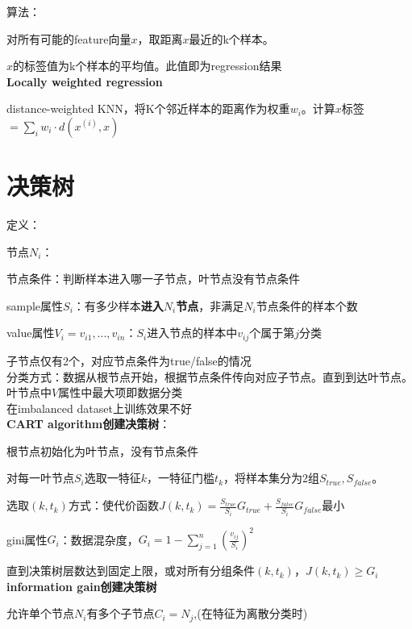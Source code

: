 \documentclass[UTF8]{ctexart}
\begin{document}
  算法：

  \quad 对所有可能的feature向量$x$，取距离$x$最近的k个样本。
  
  \quad $x$的标签值为k个样本的平均值。此值即为regression结果\\
\textbf{Locally weighted regression}

  distance-weighted KNN，将K个邻近样本的距离作为权重$w_i$。计算$x$标签$ = \sum_i w_i \cdot d(x^{(i)}, x)$



\section{决策树}
\noindent 定义：

  节点$N_i$：

  \quad 节点条件：判断样本进入哪一子节点，叶节点没有节点条件
  
  \quad sample属性$S_i$：有多少样本\textbf{进入$N_i$节点}，非满足$N_i$节点条件的样本个数

  \quad value属性$V_i = v_{i1}, ..., v_{in}$：$S_i$进入节点的样本中$v_{ij}$个属于第$j$分类
  
  \quad 子节点仅有2个，对应节点条件为true/false的情况\\
分类方式：数据从根节点开始，根据节点条件传向对应子节点。直到到达叶节点。叶节点中$V$属性中最大项即数据分类\\
在imbalanced dataset上训练效果不好\\
\textbf{CART algorithm创建决策树}：

  根节点初始化为叶节点，没有节点条件
  
  对每一叶节点$S_i$选取一特征$k$，一特征门槛$t_k$，将样本集分为2组$S_{true}, S_{false}$。
  
  \quad 选取$(k, t_k)$方式：使代价函数$J(k, t_k) = \frac{S_{true}}{S_i}G_{true} + \frac{S_{false}}{S_i}G_{false}$最小

  \quad gini属性$G_i$：数据混杂度，$G_i = 1-\sum_{j=1}^{n}(\frac{v_{ij}}{S_i})^2$

  直到决策树层数达到固定上限，或对所有分组条件$(k, t_k)$，$J(k, t_k) \geq G_i$\\
\textbf{information gain创建决策树}

  允许单个节点$N_i$有多个子节点$C_i = {N_j}$,(在特征为离散分类时)
\end{document}
